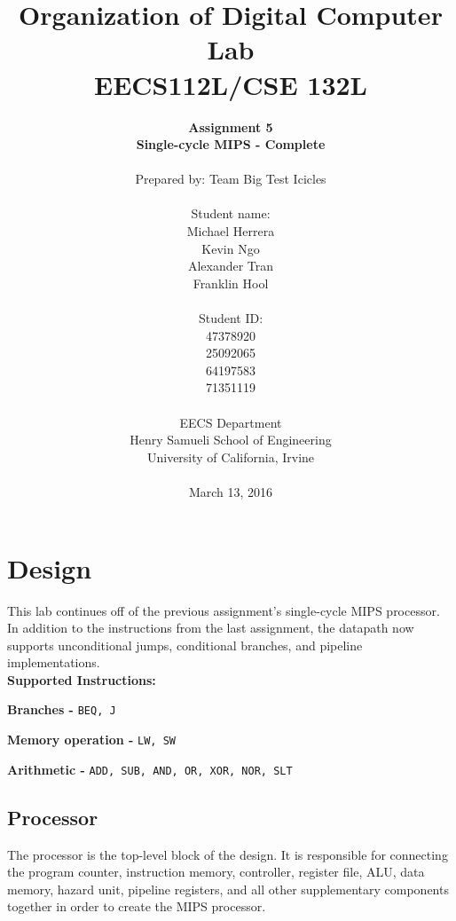 \documentclass{article}
\begin{document}
\title{Organization of Digital Computer Lab \\ EECS112L/CSE 132L}
\author{\textbf{Assignment 5 }\\ \textbf{Single-cycle MIPS - Complete} \\ \\
Prepared by: Team Big Test Icicles \\ \\ Student name: \\ Michael Herrera \\ Kevin Ngo \\ Alexander Tran \\ Franklin Hool \\ \\ Student ID: \\ 47378920 \\ 25092065 \\ 64197583 \\ 71351119 \\ \\ 
EECS Department\\ Henry Samueli School of Engineering \\ University of California, Irvine \\ \\
{March 13, 2016}} 


\date{}
\maketitle


\section{Design}
 This lab continues off of the previous assignment's single-cycle MIPS processor. In addition to the instructions from the last assignment, the datapath now supports unconditional jumps, conditional branches, and pipeline implementations.  
\\

\textbf{Supported Instructions:}

\textbf{Branches - }\texttt{BEQ, J}

\textbf{Memory operation - }\texttt{LW, SW}

\textbf{Arithmetic - }\texttt{ADD, SUB, AND, OR, XOR, NOR, SLT}

	\subsection{Processor}
	The processor is the top-level block of the design. It is responsible for connecting the program counter, instruction memory, controller, register file, ALU, data memory, hazard unit, pipeline registers, and all other supplementary components together in order to create the MIPS processor.  
	
\end{document}
